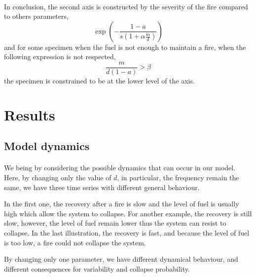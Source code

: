 \documentclass{article}
\begin{document}
\paragraph{}
In conclusion, the second axis is constructed by the severity of the fire compared to others parameters, 
\[
\exp(-\frac{1-a}{s(1+\alpha\frac{m}{d})})
\]
and for some specimen when the fuel is not enough to maintain a fire, when the following expression is not respected,
\[
\frac{m}{d( 1-a)} > \beta
\]
the specimen is constrained to be at the lower level of the axis.


\newpage

\section{Results}

\subsection{Model dynamics}




\paragraph{}
We being by considering the possible dynamics that can occur in our model. Here, by changing only the value of $d$, in particular, the frequency remain the same, we have three time series with different general behaviour.

In the first one, the recovery after a fire is slow and the level of fuel is usually high which allow the system to collapse. For another example, the recovery is still slow, however, the level of fuel remain lower thus the system can resist to collapse. In the last illustration, the recovery is fast, and because the level of fuel is too low, a fire could not collapse the system.

By changing only one parameter, we have different dynamical behaviour, and different consequences for variability and collapse probability.
\end{document}
